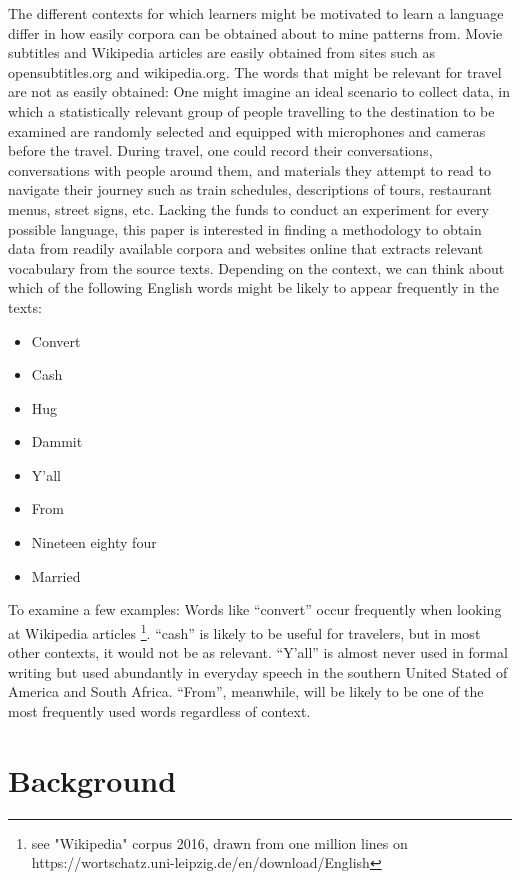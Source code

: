 The different contexts for which learners might be motivated to learn a language differ in how easily corpora can be obtained about to mine patterns from. Movie subtitles and Wikipedia articles are easily obtained from sites such as opensubtitles.org and wikipedia.org. The words that might be relevant for travel are not as easily obtained: One might imagine an ideal scenario to collect data, in which a statistically relevant group of people travelling to the destination to be examined are randomly selected and equipped with microphones and cameras before the travel. During travel, one could record their conversations, conversations with people around them, and materials they attempt to read to navigate their journey such as train schedules, descriptions of tours, restaurant menus, street signs, etc. Lacking the funds to conduct an experiment for every possible language, this paper is interested in finding a methodology to obtain data from readily available corpora and websites online that extracts relevant vocabulary from the source texts.
Depending on the context, we can think about which of the following English words might be likely to appear frequently in the texts:

\begin{itemize}
	\item Convert
	\item Cash
	\item Hug
	\item Dammit
	\item Y'all
	\item From
	\item Nineteen eighty four
	\item Married
\end{itemize}

To examine a few examples: Words like “convert” occur frequently when looking at Wikipedia articles \footnote{see "Wikipedia" corpus 2016, drawn from one million lines on https://wortschatz.uni-leipzig.de/en/download/English}. “cash” is likely to be useful for travelers, but in most other contexts, it would not be as relevant. “Y’all” is almost never used in formal writing but used abundantly in everyday speech in the southern United Stated of America and South Africa. “From”, meanwhile, will be likely to be one of the most frequently used words regardless of context.

\section{Background}
